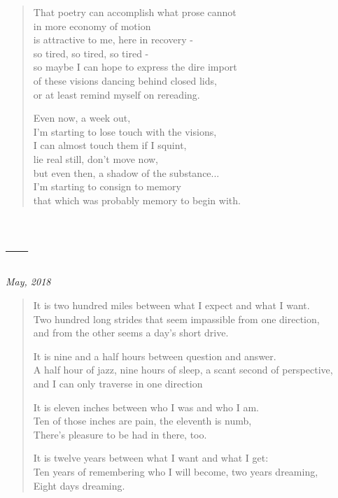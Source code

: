 \begin{verse}
That poetry can accomplish what prose cannot\\
in more economy of motion\\
is attractive to me, here in recovery -\\
\vin so tired, so tired, so tired -\\
so maybe I can hope to express the dire import\\
of these visions dancing behind closed lids,\\
or at least remind myself on rereading.

Even now, a week out,\\
I'm starting to lose touch with the visions,\\
I can almost touch them if I squint,\\
\vin lie real still, don't move now,\\
but even then, a shadow of the substance...\\
I'm starting to consign to memory\\
that which was probably memory to begin with.
\end{verse}

\newpage
\section{---}

\hfill\textit{May, 2018}

\begin{verse}
It is two hundred miles between what I expect and what I want.\\
Two hundred long strides that seem impassible from one direction,\\
\vin and from the other seems a day's short drive.

It is nine and a half hours between question and answer.\\
A half hour of jazz, nine hours of sleep, a scant second of perspective,\\
\vin and I can only traverse in one direction

It is eleven inches between who I was and who I am.\\
Ten of those inches are pain, the eleventh is numb,\\
\vin There's pleasure to be had in there, too.

It is twelve years between what I want and what I get:\\
Ten years of remembering who I will become, two years dreaming,\\
\vin Eight days dreaming.
\end{verse}

